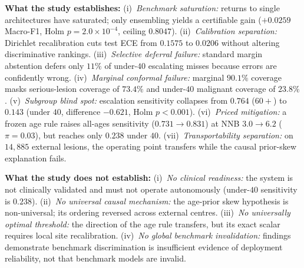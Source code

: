 \documentclass[journal]{IEEEtran}
\begin{document}
\textbf{What the study establishes:}
(i)~\emph{Benchmark saturation:} returns to single architectures have saturated; only ensembling yields a certifiable gain ($+0.0259$ Macro-F1, Holm $p=2.0\times10^{-4}$, ceiling $0.8047$).
(ii)~\emph{Calibration separation:} Dirichlet recalibration cuts test ECE from $0.1575$ to $0.0206$ without altering discriminative rankings.
(iii)~\emph{Selective deferral failure:} standard margin abstention defers only $11\%$ of under-$40$ escalating misses because errors are confidently wrong.
(iv)~\emph{Marginal conformal failure:} marginal $90.1\%$ coverage masks serious-lesion coverage of $73.4\%$ and under-$40$ malignant coverage of $23.8\%$.
(v)~\emph{Subgroup blind spot:} escalation sensitivity collapses from $0.764$ ($60+$) to $0.143$ (under $40$, difference $-0.621$, Holm $p<0.001$).
(vi)~\emph{Priced mitigation:} a frozen age rule raises all-ages sensitivity ($0.731\to0.831$) at NNB $3.0\to6.2$ ($\pi=0.03$), but reaches only $0.238$ under $40$.
(vii)~\emph{Transportability separation:} on $14{,}885$ external lesions, the operating point transfers while the causal prior-skew explanation fails.

\textbf{What the study does not establish:}
(i)~\emph{No clinical readiness:} the system is not clinically validated and must not operate autonomously (under-$40$ sensitivity is $0.238$).
(ii)~\emph{No universal causal mechanism:} the age-prior skew hypothesis is non-universal; its ordering reversed across external centres.
(iii)~\emph{No universally optimal threshold:} the direction of the age rule transfers, but its exact scalar requires local site recalibration.
(iv)~\emph{No global benchmark invalidation:} findings demonstrate benchmark discrimination is insufficient evidence of deployment reliability, not that benchmark models are invalid.
\end{document}
